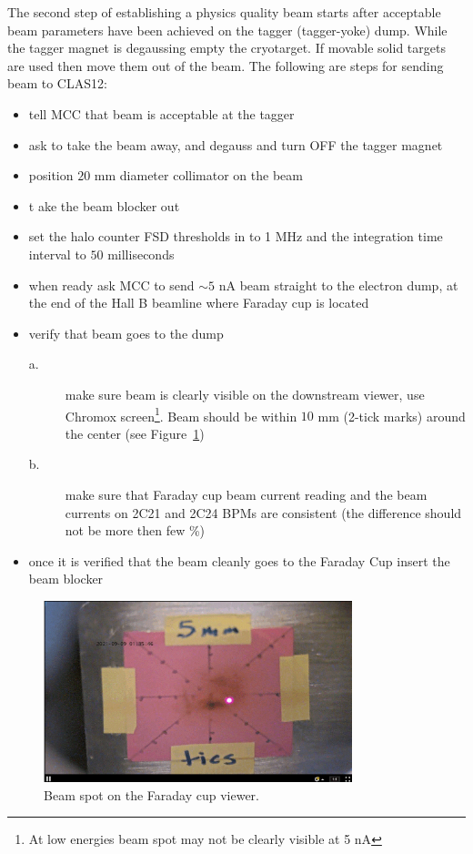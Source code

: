 The second step of establishing a physics quality beam starts after acceptable beam parameters have been achieved on the tagger (tagger-yoke) dump. While the tagger magnet is degaussing empty the cryotarget. If movable solid targets are used then move them out of the beam. 
The following are steps for sending beam to CLAS12:
\begin{itemize}
\item tell MCC that beam is acceptable at the tagger
\item ask to take the beam away, and degauss and turn OFF the tagger magnet 
\item position $20$ mm diameter collimator on the beam 
\item t ake the beam blocker out
\item set the halo counter FSD thresholds in to 1 MHz and the integration time interval to $50$ milliseconds
\item when ready ask MCC to send $\sim 5$ nA beam straight to the electron dump, at the end of the Hall B beamline where Faraday cup is located 
\item verify that beam goes to the dump 
\begin{description}
\item[a.] make sure beam is clearly visible on the downstream viewer, use Chromox screen\footnote{At low energies beam spot may not be clearly visible at 5 nA}. Beam should be within $10$ mm (2-tick marks) around the center (see Figure~\ref{fig:FC_spot})
\item[b.] make sure that Faraday cup beam current reading and the beam currents on 2C21 and 2C24 BPMs are consistent (the difference  should not be more then few \%)
\end{description}
\item once it is verified that the beam cleanly goes to the Faraday Cup insert the beam blocker 
\end{itemize}
\begin{figure}[htb!]
\centering
\includegraphics[width=0.8\textwidth]{FC_viewer.pdf}
\caption{Beam spot on the Faraday cup viewer.}
\label{fig:FC_spot}
\end{figure}

